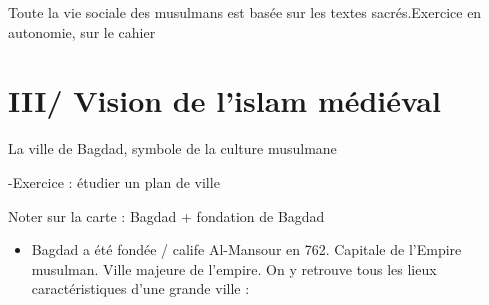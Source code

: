 \documentclass{beamer}
\begin{document}
\begin{frame}{Toute la vie sociale des musulmans est basée sur les textes sacrés.}{Exercice en autonomie, sur le cahier}



\end{frame}


\section{III/ Vision de l'islam médiéval}

\begin{frame}{La ville de Bagdad, symbole de la culture musulmane}


\end{frame}

\begin{frame}{-}{Exercice : étudier un plan de ville}


Noter sur la carte : Bagdad + fondation de Bagdad \\

\end{frame}

\begin{frame}
\begin{itemize}
\item Bagdad a été fondée / calife Al-Mansour en 762. Capitale de l'Empire musulman. Ville majeure de l'empire. On y retrouve tous les lieux caractéristiques d'une grande ville : 

\end{itemize}
\end{frame}
\end{document}
